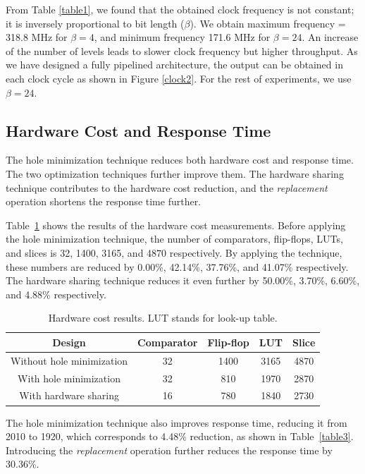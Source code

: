 \documentclass[10pt, conference, compsocconf]{IEEEtran}
\begin{document}
From Table \ref{table1}, we found that the obtained clock frequency is not constant; it is inversely proportional to bit length ($\beta$).
We obtain maximum frequency = 318.8 MHz for $\beta = 4$, and minimum frequency 171.6 MHz for $\beta = 24$.
An increase of the number of levels leads to slower clock frequency but higher throughput.
As we have designed a fully pipelined architecture, the output can be obtained in each clock cycle as shown in Figure \ref{clock2}.
For the rest of experiments, we use $\beta = 24$.

\subsection{Hardware Cost and Response Time}

The hole minimization technique reduces both hardware cost and response time.
The two optimization techniques further improve them.
The hardware sharing technique contributes to the hardware cost reduction, and the {\it replacement} operation shortens the response time further.

Table~\ref{table2} shows the results of the hardware cost measurements.
Before applying the hole minimization technique, the number of comparators, flip-flops, LUTs, and slices is 32, 1400, 3165, and 4870 respectively.
By applying the technique, these numbers are reduced by 0.00\%, 42.14\%, 37.76\%, and 41.07\% respectively.
The hardware sharing technique reduces it even further by 50.00\%, 3.70\%, 6.60\%, and 4.88\% respectively.

\begin{table}
 \begin{center}
 \caption{Hardware cost results. LUT stands for look-up table.}
\label{table2}
\begin{tabular}{|c|c|c|c|c|}
 \hline
 Design  & Comparator  & Flip-flop & LUT &Slice \\
 \hline
 \hline
Without hole minimization & 32 & 1400 & 3165 & 4870 \\
 \hline
With hole minimization & 32 & 810 & 1970 & 2870 \\
  \hline
With hardware sharing & 16 & 780 & 1840 & 2730 \\
\hline
\end{tabular}
\end{center}
\end{table}

The hole minimization technique also improves response time, reducing it from 2010 to 1920, which corresponds to 4.48\% reduction, as shown in Table~\ref{table3}.
Introducing the {\it replacement} operation further reduces the response time by 30.36\%.
\end{document}
